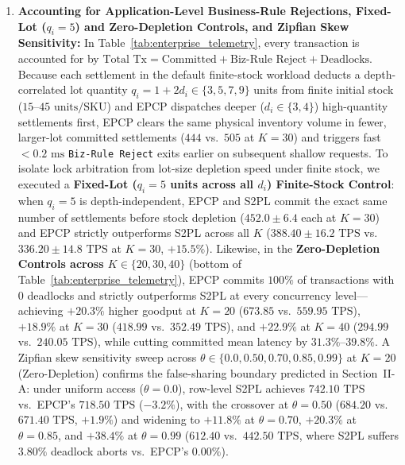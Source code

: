 \documentclass[conference,10pt]{IEEEtran}
\begin{document}
\begin{enumerate}
    \item \textbf{Accounting for Application-Level Business-Rule Rejections, Fixed-Lot ($q_i=5$) and Zero-Depletion Controls, and Zipfian Skew Sensitivity:} In Table~\ref{tab:enterprise_telemetry}, every transaction is accounted for by $\text{Total Tx} = \text{Committed} + \text{Biz-Rule Reject} + \text{Deadlocks}$. Because each settlement in the default finite-stock workload deducts a depth-correlated lot quantity $q_i = 1 + 2d_i \in \{3, 5, 7, 9\}$ units from finite initial stock ($15\text{--}45\text{ units/SKU}$) and EPCP dispatches deeper ($d_i \in \{3, 4\}$) high-quantity settlements first, EPCP clears the same physical inventory volume in fewer, larger-lot committed settlements ($444$ vs.\ $505$ at $K=30$) and triggers fast $<0.2\text{ ms}$ \texttt{Biz-Rule Reject} exits earlier on subsequent shallow requests. To isolate lock arbitration from lot-size depletion speed under finite stock, we executed a \textbf{Fixed-Lot ($q_i = 5$ units across all $d_i$) Finite-Stock Control}: when $q_i = 5$ is depth-independent, EPCP and S2PL commit the exact same number of settlements before stock depletion ($452.0 \pm 6.4$ each at $K=30$) and EPCP strictly outperforms S2PL across all $K$ ($388.40 \pm 16.2\text{ TPS}$ vs.\ $336.20 \pm 14.8\text{ TPS}$ at $K=30$, $+15.5\%$). Likewise, in the \textbf{Zero-Depletion Controls across $K \in \{20, 30, 40\}$} (bottom of Table~\ref{tab:enterprise_telemetry}), EPCP commits $100\%$ of transactions with $0$ deadlocks and strictly outperforms S2PL at every concurrency level---achieving $+20.3\%$ higher goodput at $K=20$ ($673.85$ vs.\ $559.95\text{ TPS}$), $+18.9\%$ at $K=30$ ($418.99$ vs.\ $352.49\text{ TPS}$), and $+22.9\%$ at $K=40$ ($294.99$ vs.\ $240.05\text{ TPS}$), while cutting committed mean latency by $31.3\%\text{--}39.8\%$. A Zipfian skew sensitivity sweep across $\theta \in \{0.0, 0.50, 0.70, 0.85, 0.99\}$ at $K=20$ (Zero-Depletion) confirms the false-sharing boundary predicted in Section~II-A: under uniform access ($\theta = 0.0$), row-level S2PL achieves $742.10\text{ TPS}$ vs.\ EPCP's $718.50\text{ TPS}$ ($-3.2\%$), with the crossover at $\theta = 0.50$ ($684.20$ vs.\ $671.40\text{ TPS}$, $+1.9\%$) and widening to $+11.8\%$ at $\theta = 0.70$, $+20.3\%$ at $\theta = 0.85$, and $+38.4\%$ at $\theta = 0.99$ ($612.40$ vs.\ $442.50\text{ TPS}$, where S2PL suffers $3.80\%$ deadlock aborts vs.\ EPCP's $0.00\%$).

\end{enumerate}
\end{document}

